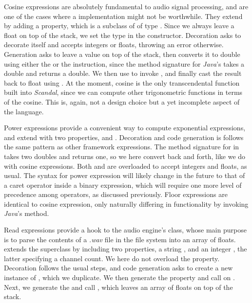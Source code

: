 Cosine expressions are absolutely fundamental to audio signal processing, and are one of the cases where a  implementation might not be worthwhile. They extend  by adding a  property, which is a subclass of  of type . Since we always leave a float on top of the stack, we set the type in the constructor. Decoration asks  to decorate itself and accepts integers or floats, throwing an error otherwise. Generation asks  to leave a value on top of the stack, then converts it to double using either the  or the  instruction, since the method signature for \emph{Java}'s  takes a double and returns a double. We then use  to invoke , and finally cast the result back to float using . At the moment, cosine is the only transcendental function built into \emph{Scandal}, since we can compute other trigonometric functions in terms of the cosine. This is, again, not a design choice but a yet incomplete aspect of the language.

Power expressions provide a convenient way to compute exponential expressions, and extend  with two properties,  and . Decoration and code generation is follows the same pattern as other framework expressions. The method signature for  in  takes two doubles and returns one, so we here convert back and forth, like we do with cosine expressions. Both  and  are overloaded to accept integers and floats, as usual. The syntax for power expression will likely change in the future to that of a caret operator inside a binary expression, which will require one more level of precedence among operators, as discussed previously. Floor expressions are identical to cosine expression, only naturally differing in functionality by invoking \emph{Java}'s  method.

Read expressions provide a hook to the audio engine's  class, whose main purpose is to parse the contents of a \emph{.wav} file in the file system into an array of floats.  extends the superclass by including two properties, a string , and an integer , the latter specifying a channel count. We here do not overload the  property. Decoration follows the usual steps, and code generation asks  to create a new instance of , which we duplicate. We then generate the  property and call  on . Next, we generate the  and call , which leaves an array of floats on top of the stack.

